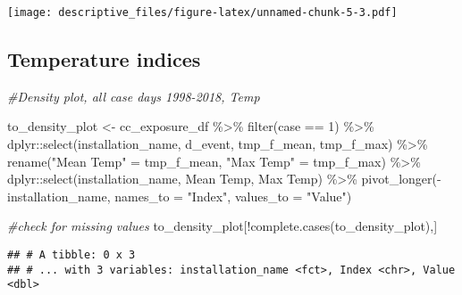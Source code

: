 \documentclass[
]{article}
\newenvironment{Shaded}{\begin{snugshade}}{\end{snugshade}}
\newcommand{\AttributeTok}[1]{\textcolor[rgb]{0.77,0.63,0.00}{#1}}
\newcommand{\CommentTok}[1]{\textcolor[rgb]{0.56,0.35,0.01}{\textit{#1}}}
\newcommand{\DecValTok}[1]{\textcolor[rgb]{0.00,0.00,0.81}{#1}}
\newcommand{\FunctionTok}[1]{\textcolor[rgb]{0.00,0.00,0.00}{#1}}
\newcommand{\NormalTok}[1]{#1}
\newcommand{\OtherTok}[1]{\textcolor[rgb]{0.56,0.35,0.01}{#1}}
\newcommand{\SpecialCharTok}[1]{\textcolor[rgb]{0.00,0.00,0.00}{#1}}
\newcommand{\StringTok}[1]{\textcolor[rgb]{0.31,0.60,0.02}{#1}}
\begin{document}
\texttt{[image: descriptive\_files/figure-latex/unnamed-chunk-5-3.pdf]}

\hypertarget{temperature-indices}{%
\subsection{Temperature indices}\label{temperature-indices}}

\begin{Shaded}
\begin{Highlighting}[]
\CommentTok{\#Density plot, all case days 1998{-}2018, Temp}


\NormalTok{to\_density\_plot }\OtherTok{\textless{}{-}}
\NormalTok{  cc\_exposure\_df }\SpecialCharTok{\%\textgreater{}\%}
    \FunctionTok{filter}\NormalTok{(case }\SpecialCharTok{==} \DecValTok{1}\NormalTok{) }\SpecialCharTok{\%\textgreater{}\%} 
\NormalTok{    dplyr}\SpecialCharTok{::}\FunctionTok{select}\NormalTok{(installation\_name, d\_event, tmp\_f\_mean, tmp\_f\_max) }\SpecialCharTok{\%\textgreater{}\%} 
    \FunctionTok{rename}\NormalTok{(}\StringTok{"Mean Temp"} \OtherTok{=}\NormalTok{ tmp\_f\_mean,}
           \StringTok{"Max Temp"} \OtherTok{=}\NormalTok{ tmp\_f\_max) }\SpecialCharTok{\%\textgreater{}\%} 
\NormalTok{    dplyr}\SpecialCharTok{::}\FunctionTok{select}\NormalTok{(installation\_name, }\StringTok{\textasciigrave{}}\AttributeTok{Mean Temp}\StringTok{\textasciigrave{}}\NormalTok{, }\StringTok{\textasciigrave{}}\AttributeTok{Max Temp}\StringTok{\textasciigrave{}}\NormalTok{) }\SpecialCharTok{\%\textgreater{}\%} 
    \FunctionTok{pivot\_longer}\NormalTok{(}\SpecialCharTok{{-}}\NormalTok{installation\_name, }\AttributeTok{names\_to =} \StringTok{"Index"}\NormalTok{, }\AttributeTok{values\_to =} \StringTok{"Value"}\NormalTok{)}

  
\CommentTok{\#check for missing values}
\NormalTok{  to\_density\_plot[}\SpecialCharTok{!}\FunctionTok{complete.cases}\NormalTok{(to\_density\_plot),] }
\end{Highlighting}
\end{Shaded}

\begin{verbatim}
## # A tibble: 0 x 3
## # ... with 3 variables: installation_name <fct>, Index <chr>, Value <dbl>
\end{verbatim}
\end{document}
